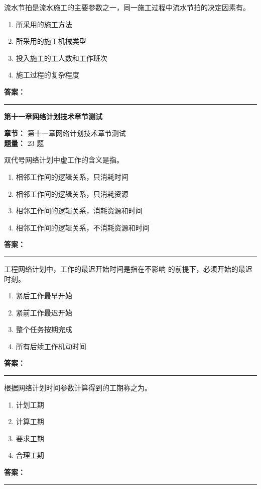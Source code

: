 \documentclass[UTF8,fontset=fandol,11pt]{ctexart}
\newcommand{\chaptertitle}[1]{\vspace{0.5em}\begin{tcolorbox}[enhanced,colback=deepblue,colframe=deepblue,arc=2mm,boxrule=0pt]\begin{center}\Large\bfseries\color{white}#1\end{center}\end{tcolorbox}\vspace{0.5em}}
\newcommand{\answerline}{\textcolor{answerred}{\rule{2.4cm}{0.7pt}}}
\begin{document}
\begin{quizbox}[title={第 23 题}]
流水节拍是流水施工的主要参数之一，同一施工过程中流水节拍的决定因素有。\\
\begin{enumerate}[label=\Alph*.]
\item 所采用的施工方法
\item 所采用的施工机械类型
\item 投入施工的工人数和工作班次
\item 施工过程的复杂程度
\end{enumerate}
\textbf{\textcolor{answerred}{答案：}} \answerline
\end{quizbox}

\chaptertitle{第十一章网络计划技术章节测试}
\begin{mainbox}
\textbf{\textcolor{mainblue}{章节：}} 第十一章网络计划技术章节测试\\
\textbf{\textcolor{answerred}{题量：}} 23 题
\end{mainbox}

\begin{quizbox}[title={第 1 题}]
双代号网络计划中虚工作的含义是指。\\
\begin{enumerate}[label=\Alph*.]
\item 相邻工作间的逻辑关系，只消耗时间
\item 相邻工作间的逻辑关系，只消耗资源
\item 相邻工作间的逻辑关系，消耗资源和时间
\item 相邻工作间的逻辑关系，不消耗资源和时间
\end{enumerate}
\textbf{\textcolor{answerred}{答案：}} \answerline
\end{quizbox}

\begin{quizbox}[title={第 2 题}]
工程网络计划中，工作的最迟开始时间是指在不影响 的前提下，必须开始的最迟时刻。\\
\begin{enumerate}[label=\Alph*.]
\item 紧后工作最早开始
\item 紧前工作最迟开始
\item 整个任务按期完成
\item 所有后续工作机动时间
\end{enumerate}
\textbf{\textcolor{answerred}{答案：}} \answerline
\end{quizbox}

\begin{quizbox}[title={第 3 题}]
根据网络计划时间参数计算得到的工期称之为。\\
\begin{enumerate}[label=\Alph*.]
\item 计划工期
\item 计算工期
\item 要求工期
\item 合理工期
\end{enumerate}
\textbf{\textcolor{answerred}{答案：}} \answerline
\end{quizbox}
\end{document}
